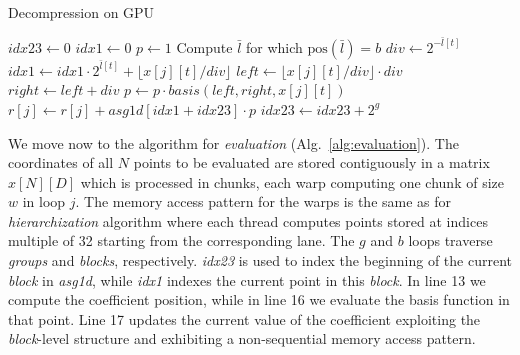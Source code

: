 \begin{algorithm}[b!]
\small{
	\caption{Decompression on GPU}
	\label{alg:evaluation}
	\begin{algorithmic}[1]
    		    \State $\textit{idx23} \leftarrow 0$
						\State $\textit{idx1} \leftarrow 0$
						\State $\textit{p} \leftarrow 1$
							\State Compute $\bar{l}$ for which $\text{pos}(\bar{l}) = b$
						\EndIf
							\State $div \leftarrow 2^{-\bar{l}[t]}$
							\State $\textit{idx1} \leftarrow \textit{idx1} \cdot 2^{\bar{l}[t]} + \lfloor	x[j][t] / div \rfloor$
							\State $left \leftarrow \lfloor x[j][t] / div \rfloor \cdot div$
							\State $right \leftarrow left + div$
							\State $p \leftarrow p \cdot basis(left, right, x[j][t])$
						\EndFor
						\State $r[j] \leftarrow r[j] + \textit{asg1d}[\textit{idx1}	+\textit{idx23}] \cdot p$ 
						\State $\textit{idx23} \leftarrow \textit{idx23} + 2^g$
					\EndFor
				\EndFor
    		\EndFor
    	\EndProcedure
 	\end{algorithmic}
}
\end{algorithm}

We move now to the algorithm for \textit{evaluation}
(Alg.~\ref{alg:evaluation}). The coordinates of all $N$ points to be evaluated
are stored contiguously in a matrix $x[N][D]$ which is processed in chunks, each
warp computing one chunk of size $w$ in loop $j$. The memory access pattern for
the warps is the same as for \textit{hierarchization} algorithm where each
thread computes points stored at indices multiple of 32 starting from the
corresponding lane. The $g$ and $b$ loops traverse \textit{groups} and
\textit{blocks}, respectively. \textit{idx23} is used to index the beginning of
the current \textit{block} in \textit{asg1d}, while \textit{idx1} indexes the
current point in this \textit{block}. In line 13 we compute the coefficient
position, while in line 16 we evaluate the basis function in that point. Line 17
updates the current value of the coefficient exploiting the \textit{block}-level
structure and exhibiting a non-sequential memory access pattern.

